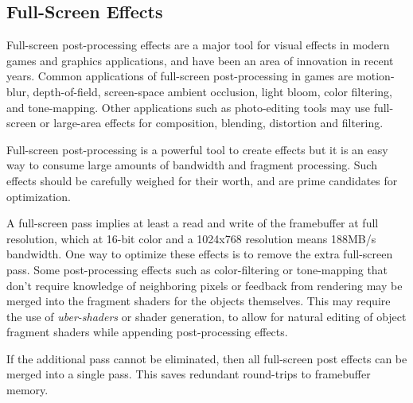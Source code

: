 \subsection {Full-Screen Effects}\label{Jon-McCaffrey-Full-Screen-Effects}
Full-screen post-processing effects are a major tool for visual effects in
modern games and graphics applications, and have been an area of innovation in
recent years.   Common applications of full-screen post-processing in games are
motion-blur, depth-of-field, screen-space ambient occlusion, light bloom, color
filtering, and tone-mapping.  Other applications such as photo-editing tools
may use full-screen or large-area effects for composition, blending, distortion
and filtering.

Full-screen post-processing is a powerful tool to create effects but it is an
easy way to consume large amounts of bandwidth and fragment processing.  Such
effects should be carefully weighed for their worth, and are prime candidates
for optimization.  

A full-screen pass implies at least a read and write of the framebuffer at full
resolution, which at 16-bit color and a 1024x768 resolution means 188MB/s
bandwidth.  One way to optimize these effects is to remove the extra
full-screen pass.  Some post-processing effects such as color-filtering or
tone-mapping that don't require knowledge of neighboring pixels or feedback
from rendering may be merged into the fragment shaders for the objects
themselves.  This may require the use of \textit{uber-shaders} or shader
generation, to allow for natural editing of object fragment shaders while
appending post-processing effects.

If the additional pass cannot be eliminated, then all full-screen post effects
can be merged into a single pass.  This saves redundant round-trips to
framebuffer memory.


